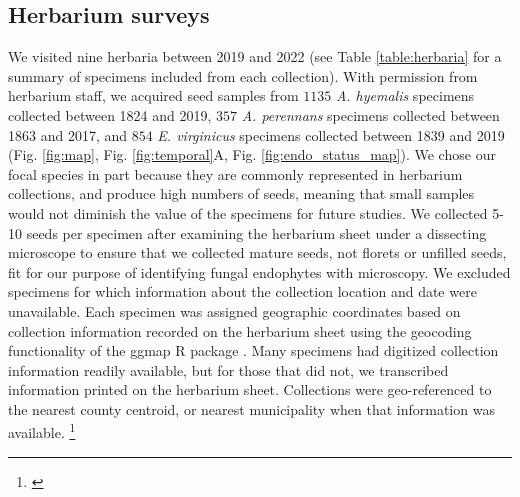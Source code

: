 \documentclass[11pt]{article}
\newcommand{\tom}[2]{{\color{red}{#1}}\footnote{\textit{\color{red}{#2}}}}
\begin{document}
		\subsection*{Herbarium surveys}
We visited nine herbaria between 2019 and 2022 (see Table \ref{table:herbaria} for a summary of specimens included from each collection). 
With permission from herbarium staff, we acquired seed samples from $1135$ \emph{A. hyemalis} specimens collected between 1824 and 2019, $357$ \emph{A. perennans} specimens collected between 1863 and 2017, and $854$ \emph{E. virginicus} specimens collected between 1839 and 2019 (Fig. \ref{fig:map}, Fig. \ref{fig:temporal}A, Fig. \ref{fig:endo_status_map}).
We chose our focal species in part because they are commonly represented in herbarium collections, and produce high numbers of seeds, meaning that small samples would not diminish the value of the specimens for future studies. 
We collected 5-10 seeds per specimen after examining the herbarium sheet under a dissecting microscope to ensure that we collected mature seeds, not florets or unfilled seeds, fit for our purpose of identifying fungal endophytes with microscopy.
We excluded specimens for which information about the collection location and date were unavailable.
Each specimen was assigned geographic coordinates based on collection information recorded on the herbarium sheet using the geocoding functionality of the ggmap R package \citep{kahle2019package}.
Many specimens had digitized collection information readily available, but for those that did not, we transcribed information printed on the herbarium sheet. 
Collections were geo-referenced to the nearest county centroid, or nearest municipality when that information was available. 
\tom{For a few of the oldest specimens, only information at the state level was available, and so we used the state centroid.}{Say how many?}
\end{document}
